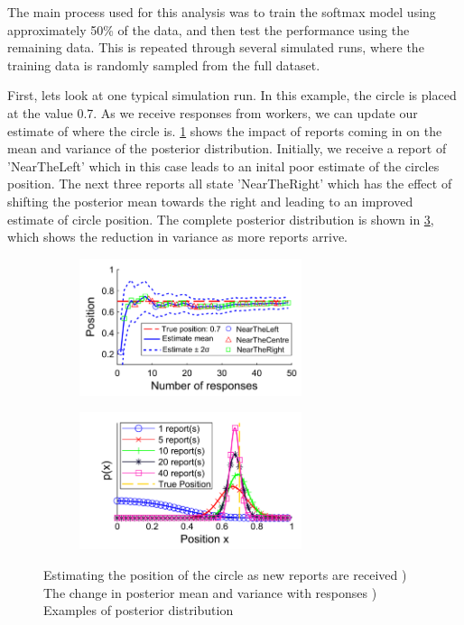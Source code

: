 The main process used for this analysis was to train the softmax model using approximately 50\% of the data, and then test the performance using the remaining data. 
This is repeated through several simulated runs, where the training data is randomly sampled from the full dataset. 


First, lets look at one typical simulation run. 
In this example, the circle is placed at the value 0.7. 
As we receive responses from workers, we can update our estimate of where the circle is. 
\ref{Figure:fusion_find_07} shows the impact of reports coming in on the mean and variance of the posterior distribution. 
Initially, we receive a report of 'NearTheLeft' which in this case leads to an inital poor estimate of the circles position. 
The next three reports all state 'NearTheRight' which has the effect of shifting the posterior mean towards the right and leading to an improved estimate of circle position. 
The complete posterior distribution is shown in \ref{Figure:fusion_find_07_dists}, which shows the reduction in variance as more reports arrive. 

\begin{figure}
	\centering
	\begin{subfigure}{6.5cm}
	\includegraphics[width=6.5cm]{line_find_07.png}
	\caption{}
	\label{Figure:fusion_find_07}
	\end{subfigure}
	\begin{subfigure}{6.5cm}
	\includegraphics[width=6.5cm]{line_find_07_dists.png}
	\caption{}
	\label{Figure:fusion_find_07_dists}
	\end{subfigure}
	\caption{Estimating the position of the circle as new reports are received  ) The change in posterior mean and variance with responses ) Examples of posterior distribution}
\end{figure}

